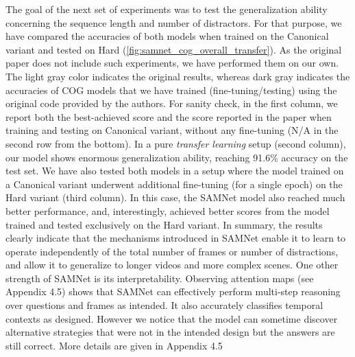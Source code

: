 The goal of the next set of experiments was to test the generalization ability concerning the sequence length and number of distractors.
For that purpose, we have compared the accuracies of both models when trained on the Canonical variant and tested on Hard (\cref{fig:samnet_cog_overall_transfer}).
As the original paper does not include such experiments, we have performed them on our own.  The light gray color indicates the original results, whereas dark gray indicates the accuracies of COG models that we have trained (fine-tuning/testing) using the original code provided by the authors.
For sanity check, in the first column, we report both the best-achieved score and the score reported in the paper when training and testing on Canonical variant, without any fine-tuning (N/A in the second row from the bottom).
In a pure \textit{transfer learning} setup (second column), our model shows enormous generalization ability, reaching 91.6\% accuracy on the test set.
We have also tested both models in a setup where the model trained on a Canonical variant underwent additional fine-tuning (for a single epoch) on the Hard variant (third column).
In this case, the SAMNet model also reached much better performance, and, interestingly, achieved better scores from the model trained and tested exclusively on the Hard variant.
In summary, the results clearly indicate that the mechanisms introduced in SAMNet  enable it to learn to operate independently of the total number of frames or number of distractions, and allow it to generalize to longer videos and more complex scenes. One other strength of SAMNet is its interpretability. Observing attention maps (see Appendix 4.5) shows that SAMNet can effectively perform multi-step reasoning over questions and frames as intended. It also accurately classifies temporal contexts as designed. However we notice that the model can sometime discover alternative strategies that were not in the intended design but the answers are still correct. More details are given in Appendix 4.5

